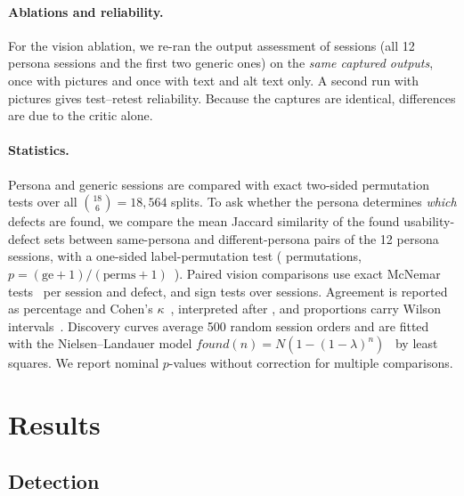 \documentclass[10pt,twocolumn]{article}
\begin{document}
\paragraph{Ablations and reliability.} For the vision ablation, we re-ran the output assessment of \AblRuns{} sessions (all 12 persona sessions and the first two generic ones) on the \emph{same captured outputs}, once with pictures and once with text and alt text only. A second run with pictures gives test--retest reliability. Because the captures are identical, differences are due to the critic alone.

\paragraph{Statistics.} Persona and generic sessions are compared with exact two-sided permutation tests over all $\binom{18}{6}=18{,}564$ splits. To ask whether the persona determines \emph{which} defects are found, we compare the mean Jaccard similarity of the found usability-defect sets between same-persona and different-persona pairs of the 12 persona sessions, with a one-sided label-permutation test (\LabelPerms{} permutations, $p=(\text{ge}+1)/(\text{perms}+1)$~\cite{phipson2010permutation,good2005permutation}). Paired vision comparisons use exact McNemar tests~\cite{mcnemar1947note} per session and defect, and sign tests over sessions. Agreement is reported as percentage and Cohen's $\kappa$~\cite{cohen1960coefficient}, interpreted after \citet{landis1977measurement}, and proportions carry Wilson intervals~\cite{wilson1927probable}. Discovery curves average 500 random session orders and are fitted with the Nielsen--Landauer model $\mathit{found}(n)=N(1-(1-\lambda)^n)$~\cite{nielsen1993mathematical} by least squares. We report nominal $p$-values without correction for multiple comparisons.

\section{Results}
\label{sec:results}



\subsection{Detection}
\label{sec:detection}
\end{document}
